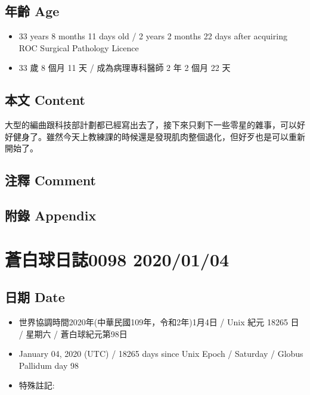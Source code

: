 \documentclass[
]{article}
\providecommand{\tightlist}{%
  \setlength{\itemsep}{0pt}\setlength{\parskip}{0pt}}
\begin{document}
\hypertarget{ux5e74ux9f61-age-33}{%
\subsection{年齡 Age}\label{ux5e74ux9f61-age-33}}

\begin{itemize}
\tightlist
\item
  33 years 8 months 11 days old / 2 years 2 months 22 days after
  acquiring ROC Surgical Pathology Licence
\item
  33 歲 8 個月 11 天 / 成為病理專科醫師 2 年 2 個月 22 天
\end{itemize}

\hypertarget{ux672cux6587-content-33}{%
\subsection{本文 Content}\label{ux672cux6587-content-33}}

大型的編曲跟科技部計劃都已經寫出去了，接下來只剩下一些零星的雜事，可以好好健身了。雖然今天上教練課的時候還是發現肌肉整個退化，但好歹也是可以重新開始了。

\hypertarget{ux6ce8ux91cb-comment-32}{%
\subsection{注釋 Comment}\label{ux6ce8ux91cb-comment-32}}

\hypertarget{ux9644ux9304-appendix-33}{%
\subsection{附錄 Appendix}\label{ux9644ux9304-appendix-33}}

\hypertarget{ux84bcux767dux7403ux65e5ux8a8c0098-20200104}{%
\section{蒼白球日誌0098
2020/01/04}\label{ux84bcux767dux7403ux65e5ux8a8c0098-20200104}}

\hypertarget{ux65e5ux671f-date-34}{%
\subsection{日期 Date}\label{ux65e5ux671f-date-34}}

\begin{itemize}
\tightlist
\item
  世界協調時間2020年(中華民國109年，令和2年)1月4日 / Unix 紀元 18265 日
  / 星期六 / 蒼白球紀元第98日
\item
  January 04, 2020 (UTC) / 18265 days since Unix Epoch / Saturday /
  Globus Pallidum day 98
\item
  特殊註記:
\end{itemize}
\end{document}
